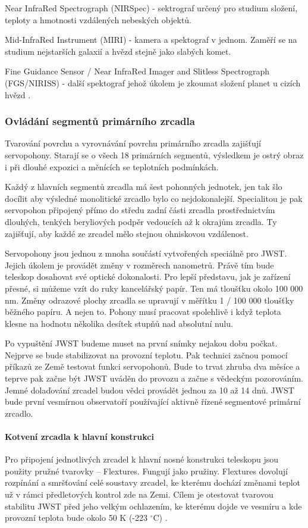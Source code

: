 \documentclass[a4paper,11pt]{article}
\begin{document}
Near InfraRed Spectrograph (NIRSpec) - sektrograf určený pro studium složení, teploty a hmotnosti vzdálených nebeských objektů.

Mid-InfraRed Instrument (MIRI) - kamera a spektograf v jednom. Zaměří se na studium nejstarších galaxií a hvězd stejně jako slabých komet.

Fine Guidance Sensor / Near InfraRed Imager and Slitless Spectrograph (FGS/NIRISS) - další spektograf jehož úkolem je zkoumat složení planet u cizích hvězd \cite{abcko}.

\subsubsection{Ovládání segmentů primárního zrcadla}
Tvarování povrchu a vyrovnávání povrchu primárního zrcadla zajišťují servopohony. Starají se o všech 18 primárních segmentů, výsledkem je ostrý obraz i při dlouhé expozici a měnících se teplotních podmínkách.


Každý z hlavních segmentů zrcadla má šest pohonných jednotek, jen tak šlo docílit aby výsledné monolitické zrcadlo bylo co nejdokonalejší. Specialitou je pak servopohon připojený přímo do středu zadní části zrcadla prostřednictvím dlouhých, tenkých beryliových podpěr vedoucích až k okrajům zrcadla. Ty zajišťují, aby každé ze zrcadel mělo stejnou ohniskovou vzdálenost.


Servopohony jsou jednou z mnoha součástí vytvořených speciálně pro JWST. Jejich úkolem je provádět změny v rozměrech nanometrů. Právě tím bude teleskop dosahovat své optické dokonalosti. Pro lepší představu, jak je zařízení přesné, si můžeme vzít do ruky kancelářský papír. Ten má  tloušťku okolo  100 000 nm. Změny odrazové plochy zrcadla se upravují v měřítku  1 / 100 000 tloušťky běžného papíru. A nejen to. Pohony musí pracovat spolehlivě i když teplota klesne na hodnotu několika desítek stupňů nad absolutní nulu.

Po vypuštění JWST budeme muset na první snímky nejakou dobu počkat. Nejprve se bude  stabilizovat na provozní teplotu. Pak technici začnou pomocí příkazů ze Země testovat funkci servopohonů. Bude to trvat zhruba dva měsíce a teprve pak začne být JWST uváděn do provozu a začne s vědeckým pozorováním. Jemné dolaďování zrcadel budou vědci provádět jednou za 10 až 14 dnů. JWST bude první vesmírnou observatoří používající aktivně řízené segmentové primární zrcadlo.

\paragraph{Kotvení zrcadla k hlavní konstrukci}
Pro připojení jednotlivých zrcadel k hlavní nosné konstrukci teleskopu jsou použity pružné tvarovky – Flextures. Fungují jako pružiny. Flextures dovolují rozpínání a smršťování celé soustavy zrcadel, ke kterému dochází změnami teplot  už v rámci předletových kontrol zde na Zemi. Cílem je otestovat tvarovou stabilitu JWST před jeho velkým ochlazením, ke kterému dojde ve vesmíru a kde provozní teplota bude okolo 50 K (-223 $^\circ$C) \cite{osel}.
\end{document}
